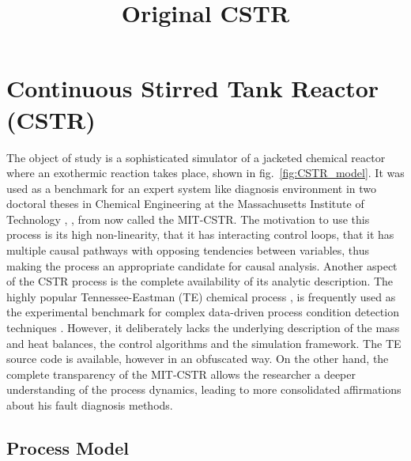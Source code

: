 \documentclass[10pt, conference, compsocconf]{IEEEtran}
\newcommand{\reffig}[1]{fig.~\ref{fig:#1}}
\begin{document}
%
\title{Original CSTR}

\maketitle


\section{Continuous Stirred Tank Reactor (CSTR)}\label{sec:CSTR}

The object of study is a sophisticated simulator of a
jacketed chemical reactor where an exothermic reaction takes place,
shown in \reffig{CSTR_model}. It was used as a benchmark for an
expert system like diagnosis environment in two doctoral theses
in Chemical Engineering at the Massachusetts Institute of Technology
\cite{phdthesisFinch1989}, \cite{phdthesisOyeleye1990},
from now called the MIT-CSTR. 
The motivation to use this process is its high non-linearity,
that it has interacting control loops, that it has multiple causal
pathways with opposing tendencies between variables, thus making the
process an appropriate candidate for causal analysis.
Another aspect of the CSTR process is the complete availability
of its analytic description. The highly popular
Tennessee-Eastman (TE) chemical process \cite{downs1993plant,chiang2001fault},
is frequently used as the
experimental benchmark for complex data-driven
process condition detection techniques
\cite{Rato2013101,Chen201433,Askarian2016104,Yin2012comparison,Yin2014realtime}.
However, it deliberately lacks the underlying description
of the mass and heat balances, the control algorithms
and the simulation framework. The TE source code is available,
however in an obfuscated way. On the other hand, the complete transparency
of the MIT-CSTR allows the researcher a deeper understanding
of the process dynamics, leading to more consolidated affirmations
about his fault diagnosis methods.
\begin{figure*}[htb!]
\centering

\caption{
The CSTR simulator defined in \cite{phdthesisFinch1989,phdthesisOyeleye1990}.
Flow rates 'FLOW' are abbreviated as 'F' in the text. All sensed variables
'MEAS' are circled.
\label{fig:CSTR_model}}
\end{figure*}


\subsection{Process Model}\label{sec:CSTRmodel}
\end{document}
